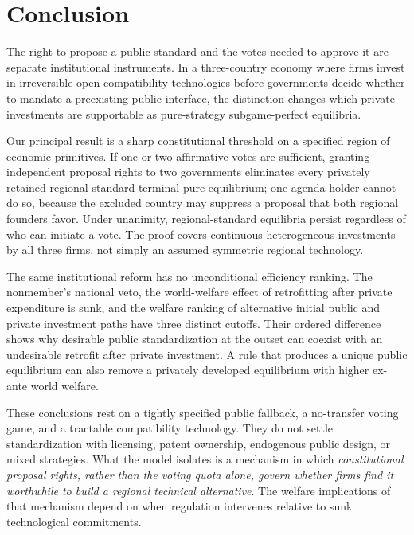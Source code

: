 \section{Conclusion}\label{sec:conclusion}

The right to propose a public standard and the votes needed to approve it are separate institutional instruments. In a three-country economy where firms invest in irreversible open compatibility technologies before governments decide whether to mandate a preexisting public interface, the distinction changes which private investments are supportable as pure-strategy subgame-perfect equilibria.

Our principal result is a sharp constitutional threshold on a specified region of economic primitives. If one or two affirmative votes are sufficient, granting independent proposal rights to two governments eliminates every privately retained regional-standard terminal pure equilibrium; one agenda holder cannot do so, because the excluded country may suppress a proposal that both regional founders favor. Under unanimity, regional-standard equilibria persist regardless of who can initiate a vote. The proof covers continuous heterogeneous investments by all three firms, not simply an assumed symmetric regional technology.

The same institutional reform has no unconditional efficiency ranking. The nonmember's national veto, the world-welfare effect of retrofitting after private expenditure is sunk, and the welfare ranking of alternative initial public and private investment paths have three distinct cutoffs. Their ordered difference shows why desirable public standardization at the outset can coexist with an undesirable retrofit after private investment. A rule that produces a unique public equilibrium can also remove a privately developed equilibrium with higher ex-ante world welfare.

These conclusions rest on a tightly specified public fallback, a no-transfer voting game, and a tractable compatibility technology. They do not settle standardization with licensing, patent ownership, endogenous public design, or mixed strategies. What the model isolates is a mechanism in which \emph{constitutional proposal rights, rather than the voting quota alone, govern whether firms find it worthwhile to build a regional technical alternative}. The welfare implications of that mechanism depend on when regulation intervenes relative to sunk technological commitments.
